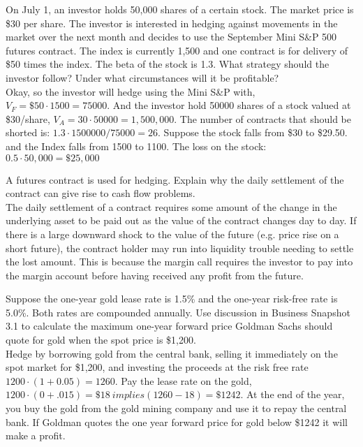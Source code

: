 \documentclass[12pt]{article}
\newenvironment{problem}[3][Problem]{\begin{trivlist}
\item[\hskip \labelsep {\bfseries #1}\hskip \labelsep {\bfseries #2.}]}{\end{trivlist}}
\begin{document}
\begin{problem}{3.18}. On July 1, an investor holds 50,000 shares of a certain stock. The market price is \$30 per share. The investor is interested in hedging against movements in the market over the next month and decides to use the September Mini S\&P 500 futures contract. The index is currently 1,500 and one contract is for delivery of \$50 times the index. The beta of the stock is 1.3. What strategy should the investor follow? Under what circumstances will it be profitable?   \\

Okay, so the investor will hedge using the Mini S\&P with, $V_F = \$50 \cdot 1500 = 75000$. And the investor hold 50000 shares of a stock valued at \$30/share, $V_A = 30 \cdot 50000 = 1,500,000 $. The number of contracts that should be shorted is: $1.3 \cdot 1500000/75000 = 26$. Suppose the stock falls from \$30 to \$29.50. and the Index falls from 1500 to 1100. The loss on the stock: $0.5 \cdot 50,000 = \$25,000$


\end{problem}

\begin{problem}{3.20}. A futures contract is used for hedging. Explain why the daily settlement of the contract can give rise to cash flow problems. \\

The daily settlement of a contract requires some amount of the change in the underlying asset to be paid out as the value of the contract changes day to day. If there is a large downward shock to the value of the future (e.g. price rise on a short future), the contract holder may run into liquidity trouble needing to settle the lost amount. This is because the margin call requires the investor to pay into the margin account before having received any profit from the future. 
\end{problem}


\begin{problem}{3.22}. Suppose the one-year gold lease rate is 1.5\% and the one-year risk-free rate is 5.0\%. Both rates are compounded annually. Use discussion in Business Snapshot 3.1 to calculate the maximum one-year forward price Goldman Sachs should quote for gold when the spot price is \$1,200.\\

 Hedge by borrowing gold from the central bank, selling it immediately on the spot market for \$1,200, and investing the proceeds at the risk free rate $1200\cdot (1+ 0.05)= 1260$. Pay the lease rate on the gold, $1200 \cdot(0 + .015) = \$18 \ implies (1260-18) = \$1242$.  At the end of the year, you buy the gold from the gold mining company and use it to repay the central bank. If Goldman quotes the one year forward price for gold below \$1242 it will make a profit. 






\end{problem}
\end{document}
